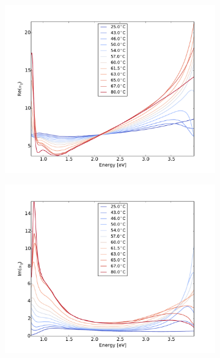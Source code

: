 %
%
\begin{figure}
    \centering
    \begin{subfigure}[b]{0.49\textwidth}
        \centering
        \includegraphics[width=\textwidth]{Results/Sim4/re_alpha_parallel.pdf}
        \caption{}
        \label{fig:2}
    \end{subfigure}
    \begin{subfigure}[b]{0.49\textwidth}
        \centering
        \includegraphics[width=\textwidth]{Results/Sim4/im_alpha_parallel.pdf}
        \caption{}
        \label{fig:2}
    \end{subfigure}

\end{figure}
